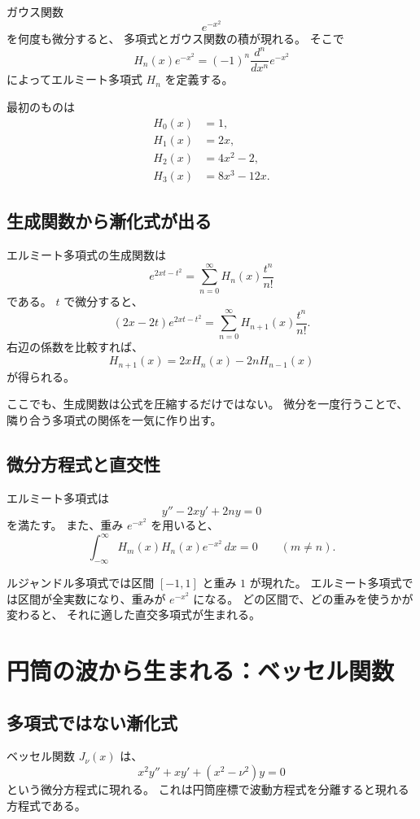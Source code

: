 ガウス関数
\[
  e^{-x^2}
\]
を何度も微分すると、
多項式とガウス関数の積が現れる。
そこで
\[
  H_n(x)e^{-x^2}
  =(-1)^n\frac{d^n}{dx^n}e^{-x^2}
\]
によってエルミート多項式 $H_n$ を定義する。

最初のものは
\[
\begin{aligned}
  H_0(x)&=1,\\
  H_1(x)&=2x,\\
  H_2(x)&=4x^2-2,\\
  H_3(x)&=8x^3-12x.
\end{aligned}
\]

\subsection{生成関数から漸化式が出る}

エルミート多項式の生成関数は
\[
  e^{2xt-t^2}
  =\sum_{n=0}^{\infty}H_n(x)\frac{t^n}{n!}
\]
である。
$t$ で微分すると、
\[
  (2x-2t)e^{2xt-t^2}
  =\sum_{n=0}^{\infty}H_{n+1}(x)\frac{t^n}{n!}.
\]
右辺の係数を比較すれば、
\[
  H_{n+1}(x)=2xH_n(x)-2nH_{n-1}(x)
\]
が得られる。

ここでも、生成関数は公式を圧縮するだけではない。
微分を一度行うことで、隣り合う多項式の関係を一気に作り出す。

\subsection{微分方程式と直交性}

エルミート多項式は
\[
  y''-2xy'+2ny=0
\]
を満たす。
また、重み $e^{-x^2}$ を用いると、
\[
  \int_{-\infty}^{\infty}
  H_m(x)H_n(x)e^{-x^2}\,dx=0
  \qquad(m\neq n).
\]

ルジャンドル多項式では区間 $[-1,1]$ と重み $1$ が現れた。
エルミート多項式では区間が全実数になり、重みが $e^{-x^2}$ になる。
どの区間で、どの重みを使うかが変わると、
それに適した直交多項式が生まれる。

\section{円筒の波から生まれる：ベッセル関数}

\subsection{多項式ではない漸化式}

ベッセル関数 $J_\nu(x)$ は、
\[
  x^2y''+xy'+(x^2-\nu^2)y=0
\]
という微分方程式に現れる。
これは円筒座標で波動方程式を分離すると現れる方程式である。


